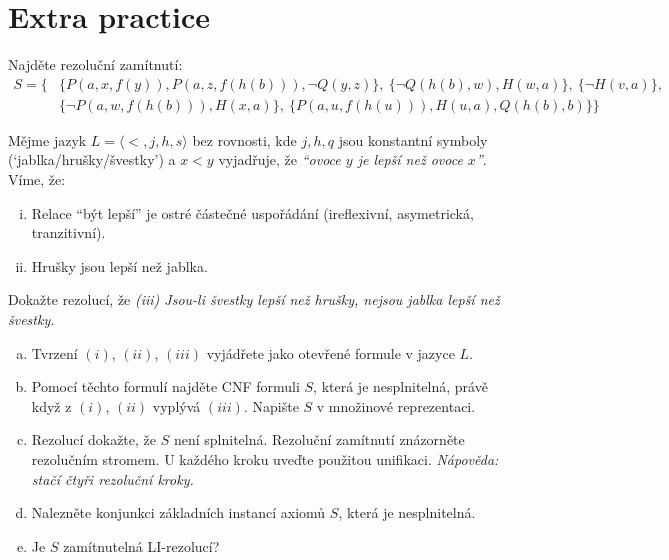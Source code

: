         
\section*{Extra practice}


\begin{problem}
    Najděte rezoluční zamítnutí: 
    \begin{align*}
        S=\{
            &\{P(a,x,f(y)),P(a,z,f(h(b))),\neg Q(y,z)\},\
            \{\neg Q(h(b),w),H(w,a)\},\ 
            \{\neg H(v,a)\},\\
            &\{\neg P(a,w,f(h(b))),H(x,a)\},\
            \{P(a,u,f(h(u))),H(u,a),Q(h(b),b)\}            
        \}
    \end{align*}
   

\end{problem}


\begin{problem}

    Mějme jazyk $L=\langle <, j, h, s\rangle$ bez rovnosti, kde $j,h,q$ jsou konstantní symboly (`jablka/hrušky/švestky') a $x < y$ vyjadřuje, že {\it ``ovoce $y$ je lepší než ovoce $x$''}. Víme, že:
    \begin{enumerate}[(i)]\it
        \item Relace ``být lepší'' je ostré částečné uspořádání (ireflexivní, asymetrická, tranzitivní).
        \item Hrušky jsou lepší než jablka.
    \end{enumerate}
    Dokažte rezolucí, že \emph{(iii) Jsou-li švestky lepší než hrušky, nejsou jablka lepší než švestky.}

    \begin{enumerate}[(a)]
    \item Tvrzení $(i)$, $(ii)$, $(iii)$ vyjádřete jako otevřené formule v jazyce $L$.
    \item Pomocí těchto formulí najděte CNF formuli $S$, která je nesplnitelná, právě když z $(i)$, $(ii)$ vyplývá $(iii)$. Napište $S$ v množinové reprezentaci.
    \item Rezolucí dokažte, že $S$ není splnitelná. Rezoluční zamítnutí znázorněte rezolučním stromem. U každého kroku uveďte použitou unifikaci. {\it Nápověda: stačí čtyři rezoluční kroky.}
    \item Nalezněte konjunkci základních instancí axiomů $S$, která je nesplnitelná.
    \item Je $S$ zamítnutelná LI-rezolucí?
    \end{enumerate}

\end{problem}



